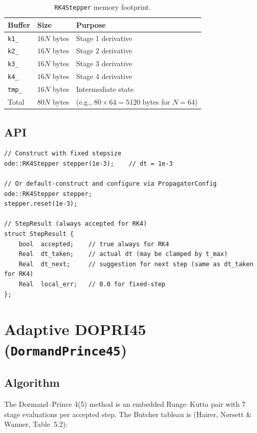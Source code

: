 \documentclass[11pt,a4paper,twoside]{book}
\newcommand{\code}[1]{\texttt{\small#1}}
\theoremstyle{definition}
\theoremstyle{remark}
\begin{document}
\begin{table}[H]
\centering
\caption{\code{RK4Stepper} memory footprint.}
\label{tab:rk4-memory}
\begin{tabular}{lll}
\toprule
\textbf{Buffer} & \textbf{Size} & \textbf{Purpose} \\
\midrule
\code{k1\_}  & $16N$ bytes & Stage 1 derivative \\
\code{k2\_}  & $16N$ bytes & Stage 2 derivative \\
\code{k3\_}  & $16N$ bytes & Stage 3 derivative \\
\code{k4\_}  & $16N$ bytes & Stage 4 derivative \\
\code{tmp\_} & $16N$ bytes & Intermediate state \\
\midrule
Total & $80N$ bytes & (e.g., $80\times64 = 5120$ bytes for $N=64$) \\
\bottomrule
\end{tabular}
\end{table}

\subsection{API}
\label{subsec:rk4-api}

\begin{verbatim}
// Construct with fixed stepsize
ode::RK4Stepper stepper(1e-3);    // dt = 1e-3

// Or default-construct and configure via PropagatorConfig
ode::RK4Stepper stepper;
stepper.reset(1e-3);

// StepResult (always accepted for RK4)
struct StepResult {
    bool  accepted;    // true always for RK4
    Real  dt_taken;    // actual dt (may be clamped by t_max)
    Real  dt_next;     // suggestion for next step (same as dt_taken for RK4)
    Real  local_err;   // 0.0 for fixed-step
};
\end{verbatim}

\section{Adaptive DOPRI45 (\texttt{DormandPrince45})}
\label{sec:dopri45}

\subsection{Algorithm}
\label{subsec:dopri45-algorithm}

The Dormand--Prince 4(5) method is an embedded Runge--Kutta pair
with 7 stage evaluations per accepted step. The Butcher tableau
is (Hairer, N{\o}rsett \& Wanner, Table~5.2):
\end{document}
